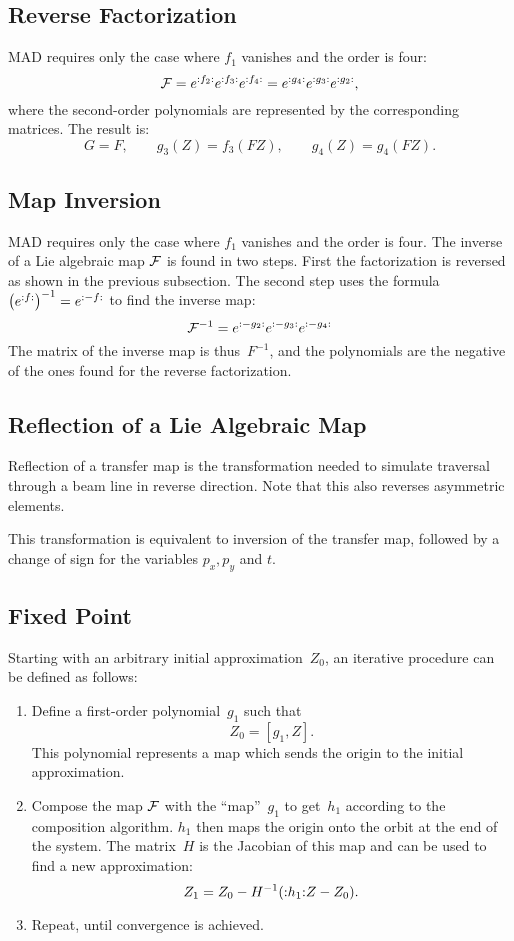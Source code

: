 \subsection{Reverse Factorization}
MAD requires only the case where $f_1$ vanishes and the order is four:
\[
{\cal F}=e^{{:}{f_2}{:}}e^{{:}{f_3}{:}}e^{{:}{f_4}{:}}
=e^{{:}{g_4}{:}}e^{{:}{g_3}{:}}e^{{:}{g_2}{:}},
\]
where the second-order polynomials are represented by the
corresponding matrices.
The result is:
\[
G = F, \qquad g_3(Z) = f_3(F Z), \qquad g_4(Z) = g_4(F Z).
\]
 
\subsection{Map Inversion}
MAD requires only the case where $f_1$ vanishes and the order is four.
The inverse of a Lie algebraic map ${\cal F}$ is found in two steps.
First the factorization is reversed as shown in the previous subsection.
The second step uses the formula 
$\left(e^{{:}{f}{:}}\right)^{-1} = e^{{:}{-f}{:}}$
to find the inverse map:
\[
{\cal F}^{-1}=e^{{:}{-g_2}{:}}e^{{:}{-g_3}{:}}e^{{:}{-g_4}{:}}
\]
The matrix of the inverse map is thus~$F^{-1}$,
and the polynomials are the negative of the ones found for the reverse
factorization.

\subsection{Reflection of a Lie Algebraic Map}
Reflection of a transfer map is the transformation needed to simulate
traversal through a beam line in reverse direction.
Note that this also reverses asymmetric elements.

This transformation is equivalent to inversion of the transfer map,
followed by a change of sign for the variables $p_x, p_y$ and $t$.

\subsection{Fixed Point}
Starting with an arbitrary initial approximation~$Z_0$,
an iterative procedure can be defined as follows:
\begin{enumerate}
\item
Define a first-order polynomial~$g_1$ such that
\[
Z_0 = [g_1, Z].
\]
This polynomial represents a map which sends  the origin to the
initial approximation.
\item
Compose the map $\cal F$ with the ``map''~$g_1$ to get~$h_1$
according to the composition algorithm.
$h_1$ then maps the origin onto the orbit at the end of the system.
The matrix~$H$ is the Jacobian of this map and can be used to find
a new approximation:
\[
Z_1 = Z_0 - H^{-1} ({:}{h_1}{:} Z - Z_0).
\]
\item
Repeat, until convergence is achieved.
\end{enumerate}

